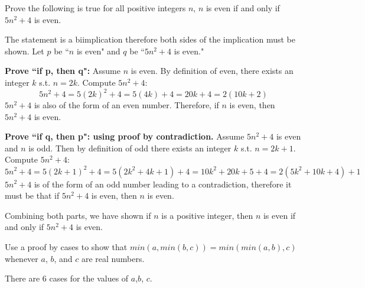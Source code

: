 \begin{questions}


 Prove the following is true for all positive integers $n$, $n$ is even if and only if $5n^2 + 4$ is even.
    \ifprintanswers
        \vspace{-10pt}
    \fi
\begin{solution}
    The statement is a biimplication therefore both sides of the
    implication must be shown.  Let $p$ be ``$n$ is even" and $q$ be
    ``$5n^2 + 4$ is even."
    
    \textbf{Prove ``if p, then q":}
    Assume $n$ is even. By definition of even, there exists an
    integer $k$ s.t. $n=2k$.  Compute $5n^2+4$:
    \[ 5n^2 + 4 = 5(2k)^2 + 4 = 5(4k) + 4 = 20k + 4 = 2(10k+2) \]
    $5n^2+4$ is also of the form of an even number.  Therefore, if $n$
    is even, then $5n^2+4$ is even.

    \smallskip
    \textbf{Prove ``if q, then p": using proof by contradiction.}
    Assume $5n^2+4$ is even and $n$ is odd.  Then by definition of odd
    there exists an integer $k$ s.t. $n=2k+1$.  Compute $5n^2+4$:
    \[ 5n^2+4 = 5(2k+1)^2+4 = 5(2k^2+4k+1)+4 = 10k^2 + 20k + 5 + 4 = 2(5k^2 + 10k + 4) + 1 \]
    $5n^2+4$ is of the form of an odd number leading to a
    contradiction, therefore it must be that if $5n^2+4$ is even, then
    $n$ is even.

    \smallskip
    Combining both parts, we have shown if $n$ is a positive integer,
    then $n$ is even if and only if $5n^2+4$ is even.
\end{solution}


\vspace{-4pt}
 Use a proof by cases to show that $min(a, min(b,c)) =
min(min(a,b),c)$ whenever $a$, $b$, and $c$ are real numbers.
    \ifprintanswers
        \vspace{-10pt}
    \fi
\begin{solution}
    There are 6 cases for the values of $a$,$b$, $c$. 


\end{solution}
\end{questions}
